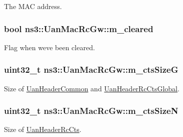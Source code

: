 The M\+AC address. 

\subsubsection[{\texorpdfstring{m\+\_\+cleared}{m_cleared}}]{\setlength{\rightskip}{0pt plus 5cm}bool ns3\+::\+Uan\+Mac\+Rc\+Gw\+::m\+\_\+cleared\hspace{0.3cm}{\ttfamily [private]}}\hypertarget{classns3_1_1UanMacRcGw_a6565d014e10e25e3883a1ca3f48896ee}{}\label{classns3_1_1UanMacRcGw_a6565d014e10e25e3883a1ca3f48896ee}
Flag when we\textquotesingle{}ve been cleared. 
\subsubsection[{\texorpdfstring{m\+\_\+cts\+SizeG}{m_ctsSizeG}}]{\setlength{\rightskip}{0pt plus 5cm}uint32\+\_\+t ns3\+::\+Uan\+Mac\+Rc\+Gw\+::m\+\_\+cts\+SizeG\hspace{0.3cm}{\ttfamily [private]}}\hypertarget{classns3_1_1UanMacRcGw_a6600adfdbcfef5bac56caeed02253235}{}\label{classns3_1_1UanMacRcGw_a6600adfdbcfef5bac56caeed02253235}


Size of \hyperlink{classns3_1_1UanHeaderCommon}{Uan\+Header\+Common} and \hyperlink{classns3_1_1UanHeaderRcCtsGlobal}{Uan\+Header\+Rc\+Cts\+Global}. 

\subsubsection[{\texorpdfstring{m\+\_\+cts\+SizeN}{m_ctsSizeN}}]{\setlength{\rightskip}{0pt plus 5cm}uint32\+\_\+t ns3\+::\+Uan\+Mac\+Rc\+Gw\+::m\+\_\+cts\+SizeN\hspace{0.3cm}{\ttfamily [private]}}\hypertarget{classns3_1_1UanMacRcGw_a2507eef2cc37e441e72644650341bf70}{}\label{classns3_1_1UanMacRcGw_a2507eef2cc37e441e72644650341bf70}


Size of \hyperlink{classns3_1_1UanHeaderRcCts}{Uan\+Header\+Rc\+Cts}. 

